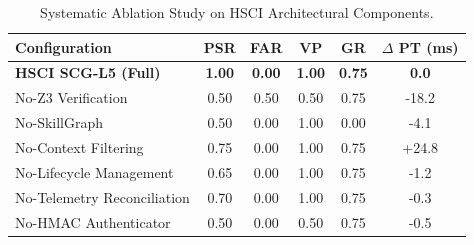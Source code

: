 \begin{table}[h!]
\centering
\caption{Systematic Ablation Study on HSCI Architectural Components.}
\label{tab:ablation_results}
\begin{tabular}{lccccc}
\hline
\textbf{Configuration} & \textbf{PSR} & \textbf{FAR} & \textbf{VP} & \textbf{GR} & \textbf{$\Delta$ PT (ms)} \\
\hline
\textbf{HSCI SCG-L5 (Full)} & \textbf{1.00} & \textbf{0.00} & \textbf{1.00} & \textbf{0.75} & \textbf{0.0} \\
No-Z3 Verification & 0.50 & 0.50 & 0.50 & 0.75 & -18.2 \\
No-SkillGraph & 0.50 & 0.00 & 1.00 & 0.00 & -4.1 \\
No-Context Filtering & 0.75 & 0.00 & 1.00 & 0.75 & +24.8 \\
No-Lifecycle Management & 0.65 & 0.00 & 1.00 & 0.75 & -1.2 \\
No-Telemetry Reconciliation & 0.70 & 0.00 & 1.00 & 0.75 & -0.3 \\
No-HMAC Authenticator & 0.50 & 0.00 & 0.50 & 0.75 & -0.5 \\
\hline
\end{tabular}
\end{table}
